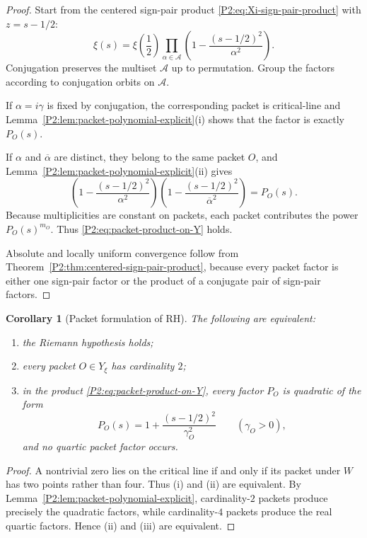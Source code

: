 \documentclass[11pt,a4paper]{article}
\numberwithin{equation}{section}
\newtheorem{corollary}[theorem]{Corollary}
\theoremstyle{definition}
\theoremstyle{remark}
\begin{document}
\begin{proof}
Start from the centered sign-pair product \eqref{P2:eq:Xi-sign-pair-product} with $z=s-1/2$:
\[
\xi(s)=\xi\!\left(\frac12\right)\prod_{\alpha\in\mathcal A}\left(1-\frac{(s-1/2)^2}{\alpha^2}\right).
\]
Conjugation preserves the multiset $\mathcal A$ up to permutation.  Group the factors according to conjugation orbits on $\mathcal A$.

If $\alpha=i\gamma$ is fixed by conjugation, the corresponding packet is critical-line and Lemma~\ref{P2:lem:packet-polynomial-explicit}(i) shows that the factor is exactly $P_O(s)$.

If $\alpha$ and $\overline\alpha$ are distinct, they belong to the same packet $O$, and Lemma~\ref{P2:lem:packet-polynomial-explicit}(ii) gives
\[
\left(1-\frac{(s-1/2)^2}{\alpha^2}\right)
\left(1-\frac{(s-1/2)^2}{\overline\alpha^2}\right)
=P_O(s).
\]
Because multiplicities are constant on packets, each packet contributes the power $P_O(s)^{m_O}$.  Thus \eqref{P2:eq:packet-product-on-Y} holds.

Absolute and locally uniform convergence follow from Theorem~\ref{P2:thm:centered-sign-pair-product}, because every packet factor is either one sign-pair factor or the product of a conjugate pair of sign-pair factors.
\end{proof}

\begin{corollary}[Packet formulation of RH]\label{P2:cor:RH-packet-criterion}
The following are equivalent:
\begin{enumerate}[label=(\roman*)]
\item the Riemann hypothesis holds;
\item every packet $O\in Y_\xi$ has cardinality $2$;
\item in the product \eqref{P2:eq:packet-product-on-Y}, every factor $P_O$ is quadratic of the form
\[
P_O(s)=1+\frac{(s-1/2)^2}{\gamma_O^2}
\qquad (\gamma_O>0),
\]
and no quartic packet factor occurs.
\end{enumerate}
\end{corollary}

\begin{proof}
A nontrivial zero lies on the critical line if and only if its packet under $W$ has two points rather than four.  Thus (i) and (ii) are equivalent.  By Lemma~\ref{P2:lem:packet-polynomial-explicit}, cardinality-$2$ packets produce precisely the quadratic factors, while cardinality-$4$ packets produce the real quartic factors.  Hence (ii) and (iii) are equivalent.
\end{proof}
\end{document}
